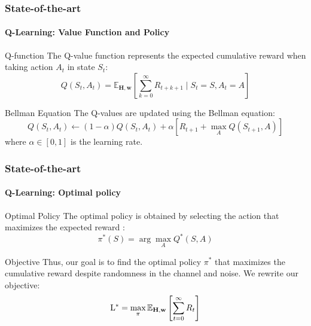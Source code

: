 \documentclass[11pt,aspectratio=1610]{beamer}
\begin{document}

    \begin{frame}
        \frametitle{State-of-the-art}
        \framesubtitle{Q-Learning: Value Function and Policy}
        \begin{block}{Q-function} 
            The Q-value function represents the expected cumulative reward when taking action $A_t$ in state $S_t$:
            \begin{equation*}
                Q(S_t, A_t) = \mathbb{E}_{\mathbf H,\mathbf w}\left[\sum_{k=0}^{\infty} R_{t+k+1} \mid S_t = S, A_t = A\right]
            \end{equation*}
        \end{block} 
        \pause
        \begin{block}{Bellman Equation}
            The Q-values are updated using the Bellman equation:
            \begin{equation*}
                Q(S_t, A_t) \leftarrow {(1-\alpha) Q(S_t, A_t) + \alpha[{R}_{t+1} + \max_{A}Q(S_{t+1}, A)]}
            \end{equation*}
            where $\alpha \in [0,1]$ is the learning rate.
        \end{block}
    \end{frame}


    \begin{frame}
        \frametitle{State-of-the-art}
        \framesubtitle{Q-Learning: Optimal policy}
        \begin{block}{Optimal Policy}
            The optimal policy is obtained by selecting the action that maximizes the expected reward :
            \begin{equation*}
                \pi^*(S) = \arg\max_{A} Q^*(S,A)
            \end{equation*}
        \end{block}
        \pause
        \begin{block}{Objective}
            Thus, our goal is to find the optimal policy $\pi^*$ that maximizes the cumulative reward despite randomness in the channel and noise. We rewrite our objective:
            \begin{equation*}
                \mathrm L^{*} = \max_{\pi}
                 \mathbb{E}_{\bold{H},\bold{w}}
                \left[
                    \sum_{t=0}^{\infty} R_t 
                \right]
            \label{eq:L_min_*}
            \end{equation*}
        \end{block}
    \end{frame}
\end{document}
